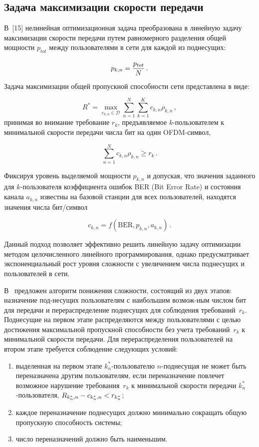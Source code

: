 \begin{multicols}{2}
\subsection{Задача максимизации скорости передачи}

  В~[15] нелинейная оптимизационная задача преобразована в линейную задачу 
максимизации скорости передачи путем равномерного разделения общей мощности 
$p_{tot}$ между пользователями в сети для каждой из поднесущих: 

\noindent
$$
p_{k,n}=\displaystyle\frac{\displaystyle p_{tot}\mathstrut}{\displaystyle N\mathstrut}\,.
$$ 
Задача максимизации общей пропускной способности сети представлена в виде:

\noindent
$$
R^*=\max\limits_{c_{k,n}\in\mathcal{D}} \sum\limits_{n=1}^N \sum\limits_{k=1}^K 
c_{k,n} \rho_{k,n}\,,
$$ 
принимая во внимание требование $r_k$, предъявляемое $k$-поль\-зо\-ва\-те\-лем 
к минимальной ско\-рости передачи чис\-ла бит на один OFDM-сим\-вол, 

\noindent
$$
\sum\limits_{n=1}^N c_{k,n}\rho_{k,n}\geq r_k\,.
$$
  
  Фиксируя уровень выделяемой мощности $p_{k,n}$ и допуская, что значения 
заданного для $k$-поль\-зо\-ва\-те\-ля коэффициента ошибок BER (Bit Error Rate) и состояния 
канала $a_{k,n}$ известны на базовой станции для всех пользователей, находятся 
значения числа бит/символ 

\noindent
$$
c_{k,n}=f(\mathrm{BER}, p_{k,n}, a_{k,n})\,.
$$

Данный подход позволяет 
эффективно решить линейную задачу оптимизации методом це\-ло\-чис\-лен\-но\-го линейного 
программирования, однако предусматривает экспоненциальный рост уровня сложности с 
увеличением числа поднесущих и пользователей в сети.
  
  В~\cite{15-gai} предложен алгоритм понижения слож\-ности, состоящий из двух этапов: 
назначение под-\linebreak несущих пользователям с наибольшим воз\-мож-\linebreak ным числом бит для 
передачи и перераспределение поднесу\-щих для соблюдения требований~$r_k$. 
%
Поднесущие на первом этапе распределяются между пользователями с целью достижения 
максимальной пропускной способности без учета требований~$r_k$ к минимальной 
скорости передачи. 
%
Для перераспределения пользователей на втором этапе требуется 
соблюдение следующих условий:
  \begin{enumerate}[(1)]
\item выделенная на первом этапе $k_n^*$-поль\-зо\-ва\-те\-лю $n$-поднесущая не может 
быть переназначена другим пользователям, если переназначение повлечет возможное 
нарушение требования~$r_k$ к минимальной скорости передачи 
$k_n^*$-поль\-зо\-ва\-те\-ля, $R_{k_n^*,n}\hm-c_{k_n^*,n}\hm<r_{k_n^*}$;
\item каждое переназначение поднесущих должно минимально сокращать общую 
пропускную способность сис\-темы;
\item число переназначений должно быть наименьшим.
\end{enumerate}


\end{multicols}
